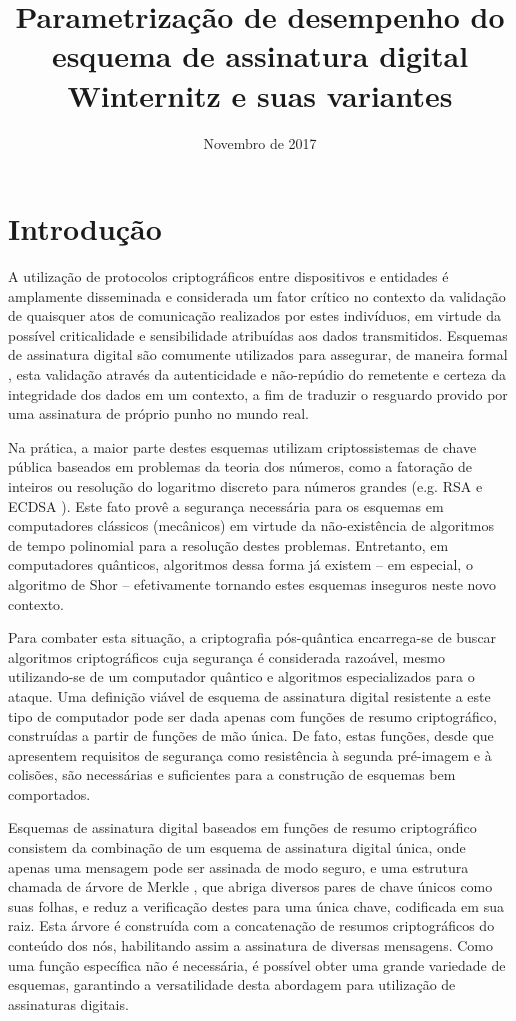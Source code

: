 \documentclass{article}
\title{Parametrização de desempenho do esquema de
assinatura digital Winternitz e suas variantes}
\author{Novembro de 2017}
\date{}
\begin{document}
\maketitle

\section{Introdução}

A utilização de protocolos criptográficos entre dispositivos e entidades é
amplamente disseminada e considerada um fator crítico no contexto da validação
de quaisquer atos de comunicação realizados por estes indivíduos, em virtude da
possível criticalidade e sensibilidade atribuídas aos dados transmitidos.
Esquemas de assinatura digital são comumente utilizados para assegurar, de
maneira formal \cite{Goldreich:2004:FCV:975541}, esta validação através da
autenticidade e não-repúdio do remetente e certeza da integridade dos dados em
um contexto, a fim de traduzir o resguardo provido por uma assinatura de
próprio punho no mundo real.

Na prática, a maior parte destes esquemas utilizam criptossistemas de chave
pública baseados em problemas da teoria dos números, como a fatoração de
inteiros ou resolução do logaritmo discreto para números grandes (e.g. RSA
\cite{Rivest:1978:MOD:359340.359342} e ECDSA \cite{Johnson2001}). Este fato
provê a segurança necessária para os esquemas em computadores clássicos
(mecânicos) em virtude da não-existência de algoritmos de tempo polinomial para
a resolução destes problemas. Entretanto, em computadores quânticos, algoritmos
dessa forma já existem -- em especial, o algoritmo de Shor
\cite{Shor:1997:PAP:264393.264406} -- efetivamente tornando estes esquemas
inseguros neste novo contexto. 

Para combater esta situação, a criptografia pós-quântica encarrega-se de buscar
algoritmos criptográficos cuja segurança é considerada razoável, mesmo
utilizando-se de um computador quântico e algoritmos especializados para o
ataque. Uma definição viável de esquema de assinatura digital resistente a este
tipo de computador pode ser dada apenas com funções de resumo criptográfico,
construídas a partir de funções de mão única. De fato, estas funções, desde que
apresentem requisitos de segurança como resistência à segunda pré-imagem e à
colisões, são necessárias e suficientes para a construção de esquemas bem
comportados. \cite{Rompel:1990:OFN:100216.100269}

Esquemas de assinatura digital baseados em funções de resumo criptográfico
consistem da combinação de um esquema de assinatura digital única, onde apenas
uma mensagem pode ser assinada de modo seguro, e uma estrutura chamada de
árvore de Merkle \cite{Merkle:1989:CDS:118209.118230}, que abriga diversos
pares de chave únicos como suas folhas, e reduz a verificação destes para uma
única chave, codificada em sua raiz. Esta árvore é construída com a
concatenação de resumos criptográficos do conteúdo dos nós, habilitando assim a
assinatura de diversas mensagens. Como uma função específica não é necessária,
é possível obter uma grande variedade de esquemas, garantindo a versatilidade
desta abordagem para utilização de assinaturas digitais.
\end{document}
